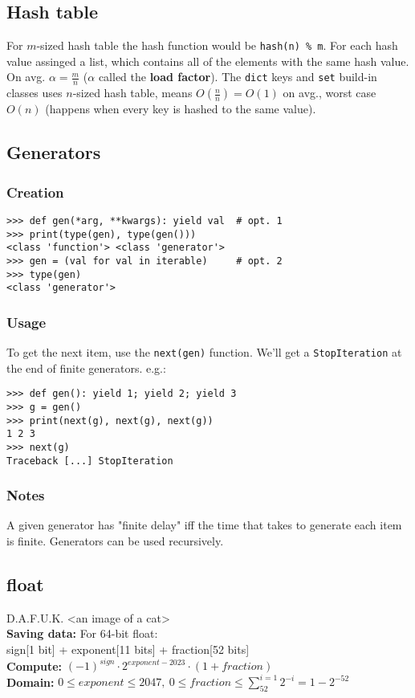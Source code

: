 \documentclass[]{article}
\begin{document}
\begin{multicols}{2}
		\subsection{Hash table}
		For $ m $-sized hash table the hash function would be \texttt{hash(n) \% m}. For each hash value assinged a list, which contains all of the elements with the same hash value. On avg. $ \alpha = \tfrac{m}{n} $ ($ \alpha $ called the \textbf{load factor}). The \texttt{dict} keys and \texttt{set} build-in classes uses $ n $-sized hash table, means $ O(\tfrac{n}{n}) = O(1) $ on avg., worst case $ O(n) $ (happens when every key is hashed to the same value).
		
		\columnbreak
		\subsection{Generators}
		\subsubsection{Creation}
		\begin{lstlisting}
>>> def gen(*arg, **kwargs): yield val  # opt. 1
>>> print(type(gen), type(gen()))
<class 'function'> <class 'generator'>
>>> gen = (val for val in iterable)     # opt. 2
>>> type(gen)
<class 'generator'>\end{lstlisting}
		\subsubsection{Usage}
		To get the next item, use the \texttt{next(gen)} function. We'll get a \texttt{StopIteration} at the end of finite generators. e.g.:
		\begin{lstlisting}[emph={StopIteration,Traceback}]
>>> def gen(): yield 1; yield 2; yield 3
>>> g = gen()
>>> print(next(g), next(g), next(g))
1 2 3
>>> next(g)
Traceback [...] StopIteration\end{lstlisting}
		\subsubsection{Notes}
		A given generator has "finite delay" iff the time that takes to generate each item is finite.
		Generators can be used recursively. 
		
		\subsection{float}
		D.A.F.U.K. <an image of a cat> \\
		\textbf{Saving data: }
		For 64-bit float: \\
		sign[1 bit] + exponent[11 bits] + fraction[52 bits] \\
		\textbf{Compute: } $ (-1)^{sign} \cdot 2^{exponent - 2023} \cdot (1 + fraction) $ \\
		\textbf{Domain: }$ 0 \le exponent \le 2047, \ 0 \le fraction \le \sum_{52}^{i = 1} 2^{-i} = 1 - 2^{-52} $
		

\end{multicols}
\end{document}

